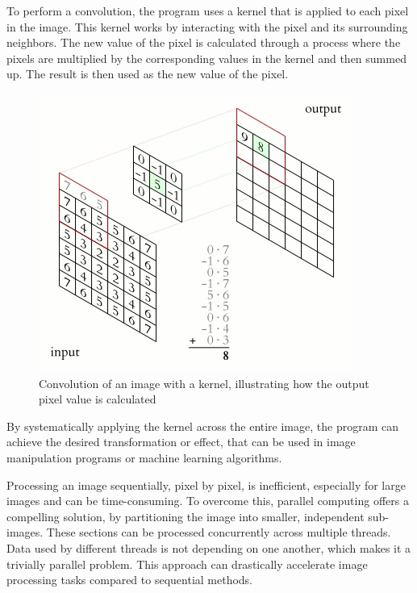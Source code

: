 \documentclass{article}
\begin{document}
\begin{multicols}{2}
    To perform a convolution, the program uses a kernel that is applied to each pixel in the image. This kernel works by interacting with the pixel and its surrounding neighbors. The new value of the pixel is calculated through a process where the pixels are multiplied by the corresponding values in the kernel and then summed up. The result is then used as the new value of the pixel.

    \begin{figure}[H]
        \centering
        \includegraphics[width=\linewidth]{img/kernel.jpg}
        \caption{Convolution of an image with a kernel, illustrating how the output pixel value is calculated}
        \label{fig:Kernel}
    \end{figure}

    By systematically applying the kernel across the entire image, the program can achieve the desired transformation or effect, that can be used in image manipulation programs or machine learning algorithms.

    Processing an image sequentially, pixel by pixel, is inefficient, especially for large images and can be time-consuming. To overcome this, parallel computing offers a compelling solution, by partitioning the image into smaller, independent sub-images. These sections can be processed concurrently across multiple threads. Data used by different threads is not depending on one another, which makes it a trivially parallel problem. This approach can drastically accelerate image processing tasks compared to sequential methods.


\end{multicols}
\end{document}
